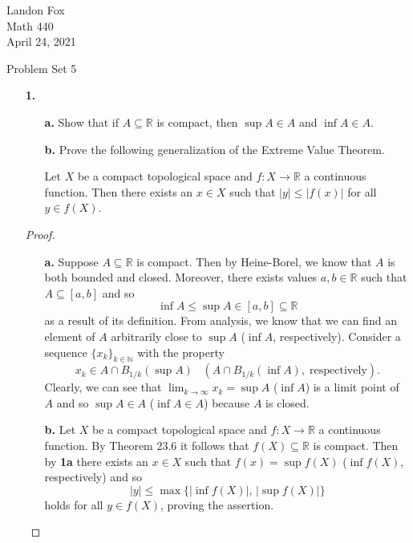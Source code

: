 \documentclass[ 12pt ]{article}
\begin{document}
\noindent Landon Fox \\
\noindent Math 440 \\
\noindent April 24, 2021

\begin{center}
	\Large Problem Set 5
\end{center}

\begin{enumerate}
	\item[\textbf{1.}]
		\begin{enumerate}
			\item[\textbf{a.}] Show that if $A \subseteq \mathbb{R}$ is compact, then $\sup A \in A$ and $\inf A \in A$.
			\item[\textbf{b.}] Prove the following generalization of the Extreme Value Theorem.
				\begin{displayquote}
					Let $X$ be a compact topological space and $f : X \to \mathbb{R}$ a continuous function. Then there exists an $x \in X$ such that $|y| \leq |f(x)|$ for all $y \in
					f(X)$.
				\end{displayquote}
		\end{enumerate}

		\begin{proof} $ $
			\begin{enumerate}
				\item[\textbf{a.}] Suppose $A \subseteq \mathbb{R}$ is compact. Then by Heine-Borel, we know that $A$ is both bounded and closed. Moreover, there exists values $a, b \in
					\mathbb{R}$ such that $A \subseteq [a, b]$ and so $$\inf A \leq \sup A \in [a, b] \subseteq \mathbb{R}$$ as a result of its definition. From analysis, we know that we
					can find an element of $A$ arbitrarily close to $\sup A$ ($\inf A$, respectively). Consider a sequence $\{ x_k \}_{k \in \mathbb{N}}$ with the property $$x_k \in A
					\cap B_{1/k}(\sup A)\;\;\; (A \cap B_{1/k}(\inf A),\; \mathrm{respectively}).$$ Clearly, we can see that $\lim_{k \to \infty} x_k = \sup A$ ($\inf A$) is a limit
					point of $A$ and so $\sup A \in A$ ($\inf A \in A$) because $A$ is closed.

				\item[\textbf{b.}] Let $X$ be a compact topological space and $f : X \to \mathbb{R}$ a continuous function. By Theorem 23.6 it follows that $f(X) \subseteq \mathbb{R}$
					is compact. Then by \textbf{1a} there exists an $x \in X$ such that $f(x) = \sup f(X)$ ($\inf f(X)$, respectively) and so $$|y| \leq \max\{ |\inf f(X)|,\,
					|\sup f(X)| \}$$ holds for all $y \in f(X)$, proving the assertion.
			\end{enumerate}
		\end{proof}



\end{enumerate}
\end{document}
